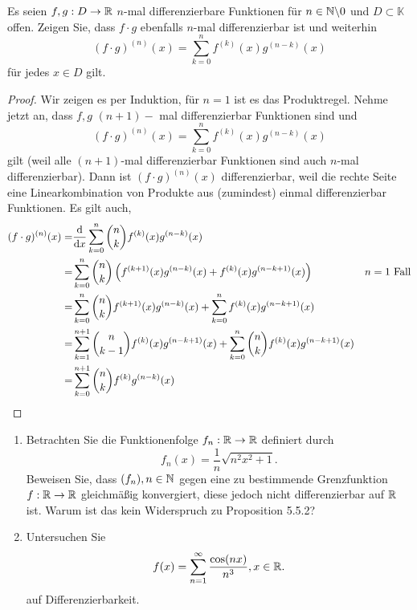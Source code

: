 \begin{Problem}
	Es seien $f, g : D \to \mathbb{R}$  $n$-mal differenzierbare Funktionen für $n \in \mathbb{N}\backslash 0$ und $D \subset  \mathbb{K}$ offen. Zeigen Sie, dass $f \cdot g$ ebenfalls $n$-mal differenzierbar ist und weiterhin
	\[
		(f\cdot g)^{(n)}(x)=\sum_{k=0}^{n} f^{(k)}(x)g^{(n-k)}(x)\] 
		für jedes $x\in D$ gilt.
\end{Problem}
\begin{proof}
	Wir zeigen es per Induktion, für $n=1$ ist es das Produktregel. Nehme jetzt an, dass $f,g$ $(n+1)-$ mal differenzierbar Funktionen sind und 
	\[
		(f\cdot g)^{(n)}(x)=\sum_{k=0}^{n} f^{(k)}(x)g^{(n-k)}(x)\]
		gilt (weil alle $(n+1)$-mal differenzierbar Funktionen sind auch $n$-mal differenzierbar). Dann ist $(f\cdot g)^{(n)}(x)$ differenzierbar, weil die rechte Seite eine Linearkombination von Produkte aus (zumindest) einmal differenzierbar Funktionen. Es gilt auch,
		\begin{align*}
			(f\cdot g)^{(n)}(x)=&\dv{x}\sum_{k=0}^{n}\binom{n}{k} f^{(k)}(x)g^{(n-k)}(x)\\
			=& \sum_{k=0}^{n} \binom{n}{k}\left( f^{(k+1)}(x)g^{(n-k)}(x)+f^{(k)}(x)g^{(n-k+1)}(x) \right) & n=1\text{ Fall} \\
			=& \sum_{k=0}^{n} \binom{n}{k}f^{(k+1)}(x)g^{(n-k)}(x)+\sum_{k=0}^{n} f^{(k)}(x)g^{(n-k+1)}(x)\\
			=&\sum_{k=1}^{n+1} \binom{n}{k-1}f^{(k)}(x)g^{(n-k+1)}(x)+\sum_{k=0}^{n}\binom{n}{k} f^{(k)}(x)g^{(n-k+1)}(x)\\
			=&\sum_{k=0}^{n+1} \binom{n}{k}f^{(k)}g^{(n-k)}(x)
		\end{align*}
\end{proof}
\begin{Problem}
	\begin{enumerate}[label=\roman*)]
		\item Betrachten Sie die Funktionenfolge $f_n:\mathbb{R} \to \mathbb{R}$ definiert durch
\[
f_n(x)=\frac{1}{n}\sqrt{n^2x^2+1} 
.\] 
Beweisen Sie, dass $(f_n),n\in \mathbb{N}$ gegen eine zu bestimmende Grenzfunktion $f : \mathbb{R} \to \mathbb{R}$  gleichmäßig konvergiert, diese jedoch nicht differenzierbar auf $\mathbb{R}$  ist. Warum ist das kein Widerspruch zu Proposition 5.5.2?  
\item Untersuchen Sie
	\[
	f(x)=\sum_{n=1}^{\infty} \frac{\cos(nx)}{n^3}, x\in \mathbb{R}
	.\] 
	auf Differenzierbarkeit.
	\end{enumerate}
\end{Problem}
